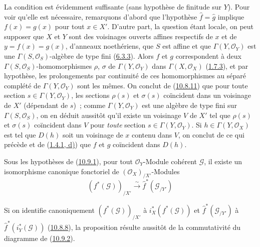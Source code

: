 La condition est évidemment suffisante (sans hypothèse de finitude sur
$Y$). Pour voir qu'elle est nécessaire, remarquons d'abord que l'hypothèse
$\widehat f=\widehat g$ implique $f(x)=g(x)$ pour tout $x\in X'$. D'autre
part, la question étant locale, on peut supposer que $X$ et $Y$ sont des
voisinages ouverts affines respectifs de $x$ et de $y=f(x)=g(x)$,
d'anneaux noethériens, que $S$ est affine et que
$\Gamma(Y,\mathscr{O}_Y)$ est une $\Gamma(S,\mathscr{O}_S)$-algèbre de
type fini (\hyperref[I.6.3.3-fr]{6.3.3}). Alors $f$ et $g$ correspondent à
deux $\Gamma(S,\mathscr{O}_S)$-homomorphismes $\rho$, $\sigma$ de
$\Gamma(Y,\mathscr{O}_Y)$ dans $\Gamma(X,\mathscr{O}_X)$
(\hyperref[I.1.7.3-fr]{1.7.3}), et par hypothèse, les prolongements par
continuité de ces homomorphismes au séparé complété de
$\Gamma(Y,\mathscr{O}_Y)$ sont les mêmes. On conclut de
(\hyperref[I.10.8.11-fr]{10.8.11}) que pour toute section
$s\in\Gamma(Y,\mathscr{O}_Y)$, les sections $\rho(s)$ et $\sigma(s)$
coïncident dans un voisinage de $X'$ (dépendant de $s$)~; comme
$\Gamma(Y,\mathscr{O}_Y)$ est une algèbre de type fini sur
$\Gamma(S,\mathscr{O}_S)$, on en déduit aussitôt qu'il existe un
voisinage $V$ de $X'$ tel que $\rho(s)$ et $\sigma(s)$ coïncident dans
$V$ pour \emph{toute} section $s\in\Gamma(Y,\mathscr{O}_Y)$. Si
$h\in\Gamma(Y,\mathscr{O}_X)$ est tel que $D(h)$ soit un voisinage de $x$
contenu dans $V$, on conclut de ce qui précède et de
(\hyperref[I.1.4.1-fr]{1.4.1, d)}) que $f$ et $g$ coïncident dans $D(h)$.

\begin{proposition}[10.9.5]
\label{I.10.9.5-fr}
Sous les hypothèses de (\hyperref[I.10.9.1-fr]{10.9.1}), pour tout
$\mathscr{O}_Y$-Module cohérent $\mathscr{G}$, il existe un isomorphisme
canonique fonctoriel de $(\mathscr{O}_X)_{/X'}$-Modules
\[
  (f^*(\mathscr{G}))_{/X'}\xrightarrow{\sim}
  \widehat f^*(\mathscr{G}_{/Y'})
\]
\end{proposition}

Si on identifie canoniquement $(f^*(\mathscr{G}))_{/X'}$ à
$i_X^*(f^*(\mathscr{G}))$ et $\widehat f^*(\mathscr{G}_{/Y'})$ à
$\widehat f^*(i_Y^*(\mathscr{G}))$
(\hyperref[I.10.8.8-fr]{10.8.8}), la proposition résulte aussitôt de la
commutativité du diagramme de
(\hyperref[I.10.9.2-fr]{10.9.2}).

